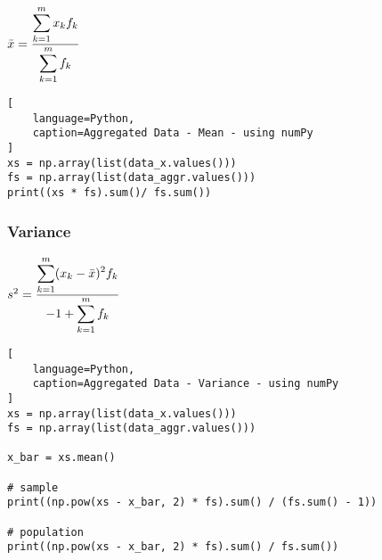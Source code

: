$
    \bar{x}
    = \dfrac{
        \displaystyle\sum_{k=1}^{m} x_kf_k
    }{
        \displaystyle\sum_{k=1}^{m} f_k
    }
$

\begin{lstlisting}[
    language=Python, 
    caption=Aggregated Data - Mean - using numPy
]
xs = np.array(list(data_x.values()))
fs = np.array(list(data_aggr.values()))
print((xs * fs).sum()/ fs.sum())
\end{lstlisting}



\subsubsection{Variance \cite{statistics/book/Statistics-for-Data-Scientists/Maurits-Kaptein}}\label{Data/Describing Data/Aggregated Data/Variance}

$
    s^2
    = \dfrac{
        \displaystyle\sum_{k=1}^{m} (x_k - \bar{x})^2 f_k
    }{
        -1 + \displaystyle\sum_{k=1}^{m} f_k
    }
$

\begin{lstlisting}[
    language=Python, 
    caption=Aggregated Data - Variance - using numPy
]
xs = np.array(list(data_x.values()))
fs = np.array(list(data_aggr.values()))

x_bar = xs.mean()

# sample
print((np.pow(xs - x_bar, 2) * fs).sum() / (fs.sum() - 1))

# population
print((np.pow(xs - x_bar, 2) * fs).sum() / fs.sum())
\end{lstlisting}


